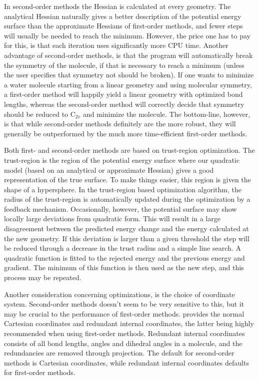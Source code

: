 In second-order methods the Hessian is calculated at every
geometry. The analytical Hessian naturally gives a better description
of the potential energy surface than the approximate Hessians of
first-order methods, and fewer steps will usually be needed to reach
the minimum. However, the price one has to pay for this, is that each
iteration uses significantly more CPU time. Another advantage of
second-order methods, is that the program will automatically break the
symmetry of the molecule, if that is necessary to reach a minimum
(unless the user specifies that symmetry not should be broken). If
one wants to minimize a water molecule starting from a linear
geometry and using molecular symmetry, a first-order method will
happily yield a linear geometry with optimized bond lengths, whereas
the second-order method will correctly decide that symmetry should be
reduced to C$_{2v}$ and minimize the molecule.
The bottom-line, however, is that while second-order methods
definitely are the more robust, they will generally be outperformed by
the much more time-efficient first-order methods.

Both first- and second-order methods are based on trust-region
optimization. The trust-region is the region of the potential energy
surface where our quadratic model (based on an analytical or
approximate Hessian) gives a good representation of the true
surface. To make things easier, this region is given the shape of a
hypersphere. In the trust-region based optimization algorithm, the
radius of the trust-region is
automatically updated during the optimization by a feedback mechanism.
Occasionally, however, the potential surface may show locally large
deviations from quadratic form. This will result in a large
disagreement between the predicted energy change and the energy
calculated at the new geometry. If this deviation is larger than a
given threshold the step will be reduced through a decrease in the
trust radius and a simple line search. A quadratic function is fitted
to the rejected energy and the previous energy and gradient. The
minimum of this function is then used as the new step, and this
process may be repeated.

Another consideration concerning optimizations, is the choice of
coordinate system. Second-order methods doesn't seem to be very
sensitive to this, but it may be crucial to the performance of
first-order methods. {\siraba} provides the normal Cartesian
coordinates and redundant internal coordinates, the latter being
highly recommended when using first-order methods. Redundant internal
coordinates consists of all bond lengths, angles and dihedral angles
in a molecule, and the redundancies are removed through
projection. The default for second-order methods is Cartesian
coordinates, while redundant internal coordinates defaults for
first-order methods.

